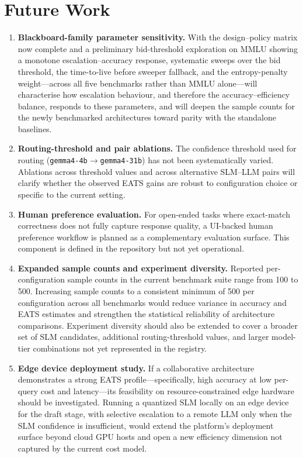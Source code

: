 \section{Future Work}

\begin{enumerate}
    \item \textbf{Blackboard-family parameter sensitivity.} With the design--policy matrix now complete and a preliminary bid-threshold exploration on MMLU showing a monotone escalation--accuracy response, systematic sweeps over the bid threshold, the time-to-live before sweeper fallback, and the entropy-penalty weight---across all five benchmarks rather than MMLU alone---will characterise how escalation behaviour, and therefore the accuracy--efficiency balance, responds to these parameters, and will deepen the sample counts for the newly benchmarked architectures toward parity with the standalone baselines.

    \item \textbf{Routing-threshold and pair ablations.} The confidence threshold used for routing (\texttt{gemma4-4b}$\rightarrow$\texttt{gemma4-31b}) has not been systematically varied. Ablations across threshold values and across alternative SLM--LLM pairs will clarify whether the observed EATS gains are robust to configuration choice or specific to the current setting.

    \item \textbf{Human preference evaluation.} For open-ended tasks where exact-match correctness does not fully capture response quality, a UI-backed human preference workflow is planned as a complementary evaluation surface. This component is defined in the repository but not yet operational.

    \item \textbf{Expanded sample counts and experiment diversity.} Reported per-configuration sample counts in the current benchmark suite range from 100 to 500. Increasing sample counts to a consistent minimum of 500 per configuration across all benchmarks would reduce variance in accuracy and EATS estimates and strengthen the statistical reliability of architecture comparisons. Experiment diversity should also be extended to cover a broader set of SLM candidates, additional routing-threshold values, and larger model-tier combinations not yet represented in the registry.

    \item \textbf{Edge device deployment study.} If a collaborative architecture demonstrates a strong EATS profile---specifically, high accuracy at low per-query cost and latency---its feasibility on resource-constrained edge hardware should be investigated. Running a quantized SLM locally on an edge device for the draft stage, with selective escalation to a remote LLM only when the SLM confidence is insufficient, would extend the platform's deployment surface beyond cloud GPU hosts and open a new efficiency dimension not captured by the current cost model.
\end{enumerate}

